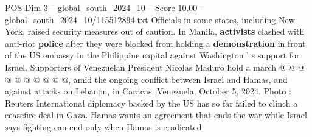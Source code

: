 \begin{textsample}{POS Dim 3 – global\_south\_2024\_10 – Score 10.00 – global\_south\_2024\_10/115512894.txt}
Officials in some states, including New York, raised security measures out of caution.
In Manila, \textbf{activists} clashed with anti-riot \textbf{police} after they were blocked from holding a \textbf{demonstration} in front of the US embassy in the Philippine capital against Washington ' s support for Israel.
Supporters of Venezuelan President Nicolas Maduro hold a march @ @ @ @ @ @ @ @ @ @, amid the ongoing conflict between Israel and Hamas, and against attacks on Lebanon, in Caracas, Venezuela, October 5, 2024.
Photo : Reuters International diplomacy backed by the US has so far failed to clinch a ceasefire deal in Gaza.
Hamas wants an agreement that ends the war while Israel says fighting can end only when Hamas is eradicated.

\end{textsample}
